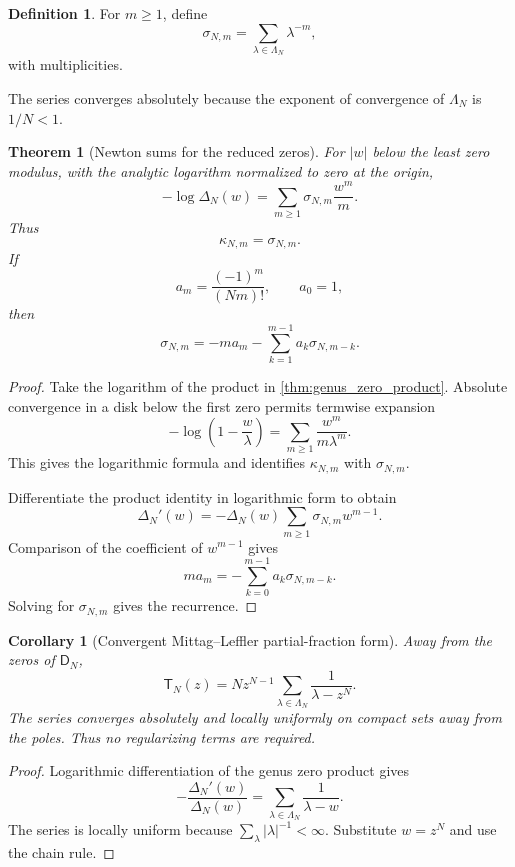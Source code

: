 \documentclass[11pt]{article}
\newtheorem{theorem}{Theorem}[section]
\newtheorem{corollary}[corollary]{Corollary}
\theoremstyle{definition}
\newtheorem{definition}[definition]{Definition}
\theoremstyle{remark}
\newcommand{\Dfun}{\mathsf D}
\newcommand{\Tfun}{\mathsf T}
\begin{document}
\begin{definition}\label{def:zero_power_sums}
For $m\geq1$, define
\[
\sigma_{N,m}
=
\sum_{\lambda\in\Lambda_N}\lambda^{-m},
\]
with multiplicities.
\end{definition}

The series converges absolutely because the exponent of convergence of $\Lambda_N$ is $1/N<1$.

\begin{theorem}[Newton sums for the reduced zeros]\label{thm:newton_sums}
For $|w|$ below the least zero modulus, with the analytic logarithm
normalized to zero at the origin,
\[
-\log\Delta_N(w)
=
\sum_{m\geq1}\sigma_{N,m}\frac{w^m}{m}.
\]
Thus
\[
\kappa_{N,m}=\sigma_{N,m}.
\]
If
\[
a_m=\frac{(-1)^m}{(Nm)!},
\qquad a_0=1,
\]
then
\[
\sigma_{N,m}
=
-ma_m-
\sum_{k=1}^{m-1}a_k\sigma_{N,m-k}.
\]
\end{theorem}

\begin{proof}
Take the logarithm of the product in \cref{thm:genus_zero_product}.  Absolute convergence in a disk below the first zero permits termwise expansion
\[
-\log\left(1-\frac w\lambda\right)
=
\sum_{m\geq1}\frac{w^m}{m\lambda^m}.
\]
This gives the logarithmic formula and identifies $\kappa_{N,m}$ with $\sigma_{N,m}$.

Differentiate the product identity in logarithmic form to obtain
\[
\Delta_N'(w)
=
-\Delta_N(w)
\sum_{m\geq1}\sigma_{N,m}w^{m-1}.
\]
Comparison of the coefficient of $w^{m-1}$ gives
\[
ma_m
=
-\sum_{k=0}^{m-1}a_k\sigma_{N,m-k}.
\]
Solving for $\sigma_{N,m}$ gives the recurrence.
\end{proof}



\begin{corollary}[Convergent Mittag--Leffler partial-fraction form]\label{cor:mittag_leffler_tangent}
Away from the zeros of $\Dfun_N$,
\[
\Tfun_N(z)
=
Nz^{N-1}
\sum_{\lambda\in\Lambda_N}
\frac1{\lambda-z^N}.
\]
The series converges absolutely and locally uniformly on compact sets
away from the poles.  Thus no regularizing terms are required.
\end{corollary}

\begin{proof}
Logarithmic differentiation of the genus zero product gives
\[
-\frac{\Delta_N'(w)}{\Delta_N(w)}
=
\sum_{\lambda\in\Lambda_N}\frac1{\lambda-w}.
\]
The series is locally uniform because $\sum_{\lambda}|\lambda|^{-1}<\infty$.  Substitute $w=z^N$ and use the chain rule.
\end{proof}
\end{document}
